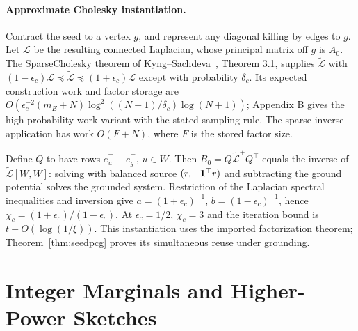 \paragraph{Approximate Cholesky instantiation.}
Contract the seed to a vertex $g$, and represent any diagonal
killing by edges to $g$. Let $\mathcal L$ be the resulting connected
Laplacian, whose principal matrix off $g$ is $A_0$. The
SparseCholesky theorem of Kyng--Sachdeva~\cite{kyng2016},
Theorem 3.1, supplies $\widetilde{\mathcal L}$ with
$(1-\epsilon_c)\mathcal L\preceq\widetilde{\mathcal L}
\preceq(1+\epsilon_c)\mathcal L$ except with probability $\delta_c$.
Its expected construction work and factor storage are
$O(\epsilon_c^{-2}(m_E+N)\log^2((N+1)/\delta_c)\log(N+1))$;
Appendix B gives the high-probability work variant with the stated
sampling rule. The sparse inverse application has work $O(F+N)$,
where $F$ is the stored factor size.

Define $Q$ to have rows $e_u^\top-e_g^\top$, $u\in W$.
Then $B_0=Q\widetilde{\mathcal L}^{+}Q^\top$ equals the inverse
of $\widetilde{\mathcal L}[W,W]$: solving with balanced source
$(r,-\mathbf 1^\top r)$ and subtracting the ground potential solves
the grounded system. Restriction of the Laplacian spectral
inequalities and inversion give
$a=(1+\epsilon_c)^{-1}$, $b=(1-\epsilon_c)^{-1}$, hence
$\chi_c=(1+\epsilon_c)/(1-\epsilon_c)$. At $\epsilon_c=1/2$,
$\chi_c=3$ and the iteration bound is $t+O(\log(1/\xi))$.
This instantiation uses the imported factorization theorem;
Theorem~\ref{thm:seedpcg} proves its simultaneous reuse under
grounding. 



\section{Integer Marginals and Higher-Power Sketches}\label{app:integer}

